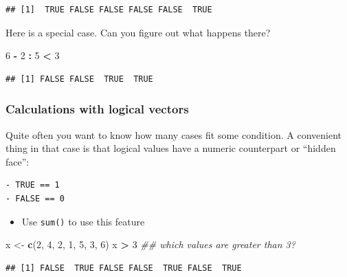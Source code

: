 \documentclass[]{book}
\newenvironment{Shaded}{\begin{snugshade}}{\end{snugshade}}
\newcommand{\CommentTok}[1]{\textcolor[rgb]{0.56,0.35,0.01}{\textit{#1}}}
\newcommand{\DecValTok}[1]{\textcolor[rgb]{0.00,0.00,0.81}{#1}}
\newcommand{\KeywordTok}[1]{\textcolor[rgb]{0.13,0.29,0.53}{\textbf{#1}}}
\newcommand{\NormalTok}[1]{#1}
\newcommand{\OperatorTok}[1]{\textcolor[rgb]{0.81,0.36,0.00}{\textbf{#1}}}
\newcommand{\StringTok}[1]{\textcolor[rgb]{0.31,0.60,0.02}{#1}}
\providecommand{\tightlist}{%
  \setlength{\itemsep}{0pt}\setlength{\parskip}{0pt}}
\begin{document}
\begin{verbatim}
## [1]  TRUE FALSE FALSE FALSE FALSE  TRUE
\end{verbatim}

Here is a special case. Can you figure out what happens there?

\begin{Shaded}
\begin{Highlighting}[]
\DecValTok{6} \OperatorTok{-}\StringTok{ }\DecValTok{2} \OperatorTok{:}\StringTok{ }\DecValTok{5} \OperatorTok{<}\StringTok{ }\DecValTok{3}
\end{Highlighting}
\end{Shaded}

\begin{verbatim}
## [1] FALSE FALSE  TRUE  TRUE
\end{verbatim}

\hypertarget{calculations-with-logical-vectors}{%
\subsubsection*{Calculations with logical vectors}\label{calculations-with-logical-vectors}}

Quite often you want to know how many cases fit some condition. A convenient thing in that case is that logical values have a numeric counterpart or ``hidden face'':

\begin{verbatim}
- TRUE == 1
- FALSE == 0
\end{verbatim}

\begin{itemize}
\tightlist
\item
  Use \texttt{sum()} to use this feature
\end{itemize}

\begin{Shaded}
\begin{Highlighting}[]
\NormalTok{x <-}\StringTok{ }\KeywordTok{c}\NormalTok{(}\DecValTok{2}\NormalTok{, }\DecValTok{4}\NormalTok{, }\DecValTok{2}\NormalTok{, }\DecValTok{1}\NormalTok{, }\DecValTok{5}\NormalTok{, }\DecValTok{3}\NormalTok{, }\DecValTok{6}\NormalTok{)}
\NormalTok{x }\OperatorTok{>}\StringTok{ }\DecValTok{3} \CommentTok{## which values are greater than 3?}
\end{Highlighting}
\end{Shaded}

\begin{verbatim}
## [1] FALSE  TRUE FALSE FALSE  TRUE FALSE  TRUE
\end{verbatim}
\end{document}

